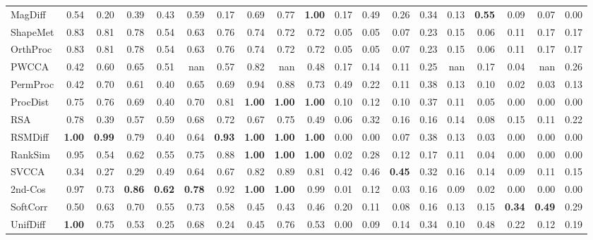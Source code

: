\begin{tabular}{l||rrr|rrr|rrr||rrr|rrr|rrr}
MagDiff & 0.54 & 0.20 & 0.39 & 0.43 & 0.59 & 0.17 & 0.69 & 0.77 & \textbf{1.00} & 0.17 & 0.49 & 0.26 & 0.34 & 0.13 & \textbf{0.55} & 0.09 & 0.07 & 0.00 \\
ShapeMet & 0.83 & 0.81 & 0.78 & 0.54 & 0.63 & 0.76 & 0.74 & 0.72 & 0.72 & 0.05 & 0.05 & 0.07 & 0.23 & 0.15 & 0.06 & 0.11 & 0.17 & 0.17 \\
OrthProc & 0.83 & 0.81 & 0.78 & 0.54 & 0.63 & 0.76 & 0.74 & 0.72 & 0.72 & 0.05 & 0.05 & 0.07 & 0.23 & 0.15 & 0.06 & 0.11 & 0.17 & 0.17 \\
PWCCA & 0.42 & 0.60 & 0.65 & 0.51 & nan & 0.57 & 0.82 & nan & 0.48 & 0.17 & 0.14 & 0.11 & 0.25 & nan & 0.17 & 0.04 & nan & 0.26 \\
PermProc & 0.42 & 0.70 & 0.61 & 0.40 & 0.65 & 0.69 & 0.94 & 0.88 & 0.73 & 0.49 & 0.22 & 0.11 & 0.38 & 0.13 & 0.10 & 0.02 & 0.03 & 0.13 \\
ProcDist & 0.75 & 0.76 & 0.69 & 0.40 & 0.70 & 0.81 & \textbf{1.00} & \textbf{1.00} & \textbf{1.00} & 0.10 & 0.12 & 0.10 & 0.37 & 0.11 & 0.05 & 0.00 & 0.00 & 0.00 \\
RSA & 0.78 & 0.39 & 0.57 & 0.59 & 0.68 & 0.72 & 0.67 & 0.75 & 0.49 & 0.06 & 0.32 & 0.16 & 0.16 & 0.14 & 0.08 & 0.15 & 0.11 & 0.22 \\
RSMDiff & \textbf{1.00} & \textbf{0.99} & 0.79 & 0.40 & 0.64 & \textbf{0.93} & \textbf{1.00} & \textbf{1.00} & \textbf{1.00} & 0.00 & 0.00 & 0.07 & 0.38 & 0.13 & 0.03 & 0.00 & 0.00 & 0.00 \\
RankSim & 0.95 & 0.54 & 0.62 & 0.55 & 0.75 & 0.88 & \textbf{1.00} & \textbf{1.00} & \textbf{1.00} & 0.02 & 0.28 & 0.12 & 0.17 & 0.11 & 0.04 & 0.00 & 0.00 & 0.00 \\
SVCCA & 0.34 & 0.27 & 0.29 & 0.49 & 0.64 & 0.67 & 0.82 & 0.89 & 0.81 & 0.42 & 0.46 & \textbf{0.45} & 0.32 & 0.16 & 0.14 & 0.09 & 0.11 & 0.15 \\
2nd-Cos & 0.97 & 0.73 & \textbf{0.86} & \textbf{0.62} & \textbf{0.78} & 0.92 & \textbf{1.00} & \textbf{1.00} & 0.99 & 0.01 & 0.12 & 0.03 & 0.16 & 0.09 & 0.02 & 0.00 & 0.00 & 0.00 \\
SoftCorr & 0.50 & 0.63 & 0.70 & 0.55 & 0.73 & 0.58 & 0.45 & 0.43 & 0.46 & 0.20 & 0.11 & 0.08 & 0.16 & 0.13 & 0.15 & \textbf{0.34} & \textbf{0.49} & 0.29 \\
UnifDiff & \textbf{1.00} & 0.75 & 0.53 & 0.25 & 0.68 & 0.24 & 0.45 & 0.76 & 0.53 & 0.00 & 0.09 & 0.14 & 0.34 & 0.10 & 0.48 & 0.22 & 0.12 & 0.19 \\
\bottomrule
\end{tabular}
